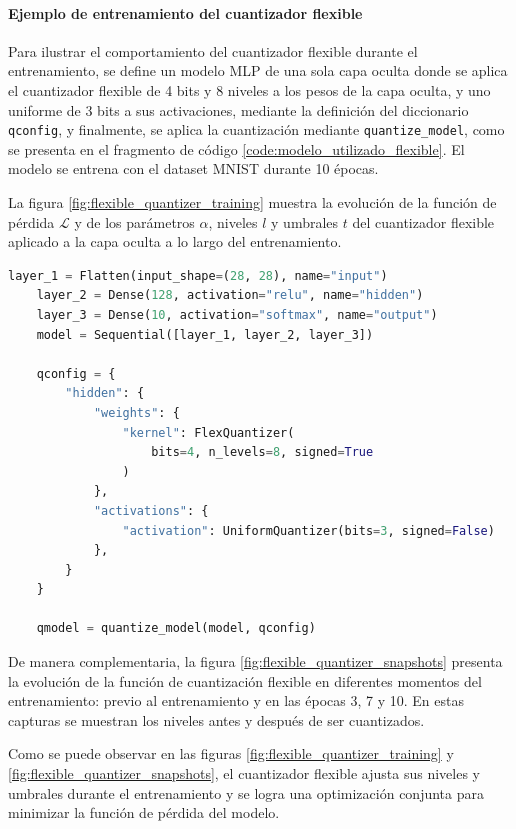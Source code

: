 \paragraph{Ejemplo de entrenamiento del cuantizador flexible}

Para ilustrar el comportamiento del cuantizador flexible durante el entrenamiento, se define un modelo MLP de una sola capa oculta donde se aplica el cuantizador flexible de 4 bits y 8 niveles a los pesos de la capa oculta, y uno uniforme de 3 bits a sus activaciones, mediante la definición del diccionario \texttt{qconfig}, y finalmente, se aplica la cuantización mediante \texttt{quantize\_model}, como se presenta en el fragmento de código \ref{code:modelo_utilizado_flexible}. El modelo se entrena con el dataset MNIST \cite{lecun1998gradient} durante 10 épocas.

La figura \ref{fig:flexible_quantizer_training} muestra la evolución de la función de pérdida $\mathcal{L}$ y de los parámetros $\alpha$, niveles $l$ y umbrales $t$ del cuantizador flexible aplicado a la capa oculta a lo largo del entrenamiento.

\begin{lstlisting}[language=Python,label=code:modelo_utilizado_flexible,caption={Definición de un modelo MLP de una sola capa oculta con Keras, con cuantización flexible}]
    layer_1 = Flatten(input_shape=(28, 28), name="input")
    layer_2 = Dense(128, activation="relu", name="hidden")
    layer_3 = Dense(10, activation="softmax", name="output")
    model = Sequential([layer_1, layer_2, layer_3])

    qconfig = {
        "hidden": {
            "weights": {
                "kernel": FlexQuantizer(
                    bits=4, n_levels=8, signed=True
                )
            },
            "activations": {
                "activation": UniformQuantizer(bits=3, signed=False)
            },
        }
    }

    qmodel = quantize_model(model, qconfig)
\end{lstlisting}




De manera complementaria, la figura \ref{fig:flexible_quantizer_snapshots} presenta la evolución de la función de cuantización flexible en diferentes momentos del entrenamiento: previo al entrenamiento y en las épocas 3, 7 y 10. En estas capturas se muestran los niveles antes y después de ser cuantizados.



Como se puede observar en las figuras \ref{fig:flexible_quantizer_training} y \ref{fig:flexible_quantizer_snapshots}, el cuantizador flexible ajusta sus niveles y umbrales durante el entrenamiento y se logra una optimización conjunta para minimizar la función de pérdida del modelo.
